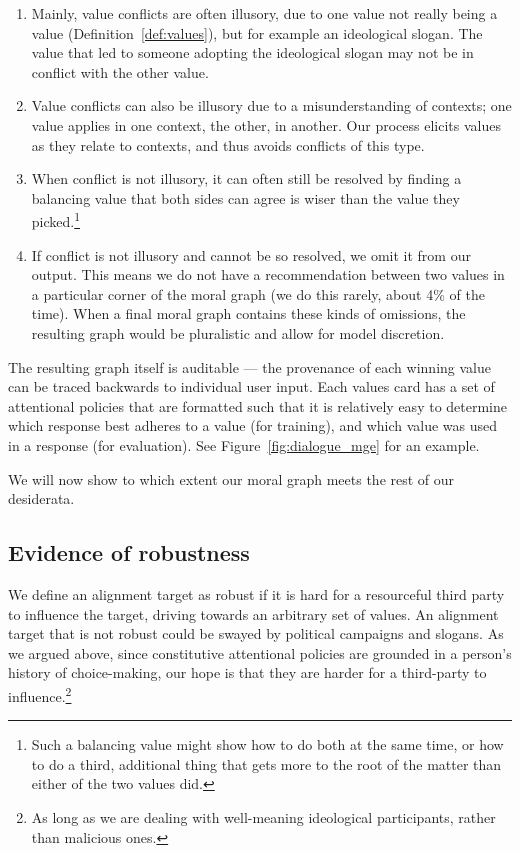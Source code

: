 \documentclass{article}
\theoremstyle{definition}
\begin{document}
\begin{enumerate}
    \item Mainly, value conflicts are often illusory, due to one value not really being a value (Definition~\ref{def:values}), but for example an ideological slogan. The value that led to someone adopting the ideological slogan may not be in conflict with the other value.
    \item Value conflicts can also be illusory due to a misunderstanding of contexts; one value applies in one context, the other, in another. Our process elicits values as they relate to contexts, and thus avoids conflicts of this type.
    \item When conflict is not illusory, it can often still be resolved by finding a balancing value that both sides can agree is wiser than the value they picked.\footnote{Such a balancing value might show how to do both at the same time, or how to do a third, additional thing that gets more to the root of the matter than either of the two values did.}
    \item If conflict is not illusory and cannot be so resolved, we omit it from our output. This means we do not have a recommendation between two values in a particular corner of the moral graph (we do this rarely, about 4\% of the time). When a final moral graph contains these kinds of omissions, the resulting graph would be pluralistic and allow for model discretion.
\end{enumerate}

The resulting graph itself is auditable --- the provenance of each winning value can be traced backwards to individual user input. Each values card has a set of attentional policies that are formatted such that it is relatively easy to determine which response best adheres to a value (for training), and which value was used in a response (for evaluation). See Figure~\ref{fig:dialogue_mge} for an example.

We will now show to which extent our moral graph meets the rest of our desiderata.

\subsection{Evidence of robustness}\label{sec:evidenceofrobustness}

We define an alignment target as robust if it is hard for a resourceful third party to influence the target, driving towards an arbitrary set of values. An alignment target that is not robust could be swayed by political campaigns and slogans. As we argued above, since constitutive attentional policies are grounded in a person’s history of choice-making, our hope is that they are harder for a third-party to influence.\footnote{As long as we are dealing with well-meaning ideological participants, rather than malicious ones.}
\end{document}
